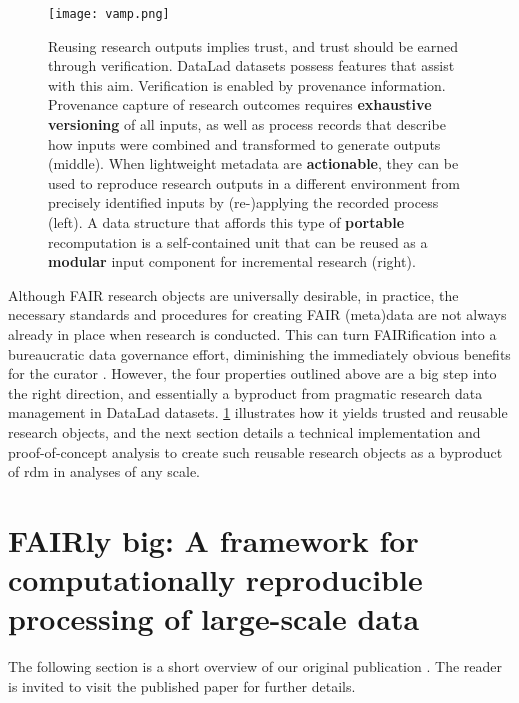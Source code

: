 \begin{figure}[H]
	\centering
	\texttt{[image: vamp.png]}
	\caption[DataLad datasets as reusable research objects]{Reusing research outputs implies trust, and trust should be earned through verification. DataLad datasets possess features that assist with this aim. Verification is enabled by provenance information. Provenance capture of research outcomes requires \textbf{exhaustive versioning} of all inputs, as well as process records that describe how inputs were combined and transformed to generate outputs (middle). When lightweight metadata are \textbf{actionable}, they can be used to reproduce research outputs in a different environment from precisely identified inputs by (re-)applying the recorded process (left). A data structure that affords this type of \textbf{portable} recomputation is a self-contained unit that can be reused as a \textbf{modular} input component for incremental research (right).
	}
	\label{fig:vamp}
\end{figure}

Although FAIR research objects are universally desirable, in practice, the necessary standards and procedures for creating FAIR (meta)data are not always already in place when research is conducted.
This can turn FAIRification into a bureaucratic data governance effort, diminishing the immediately obvious benefits for the curator \citep{zehl2016handling}.
However, the four properties outlined above are a big step into the right direction, and essentially a byproduct from pragmatic research data management in DataLad datasets.
\cref{fig:vamp} illustrates how it yields trusted and reusable research objects, and the next section details a technical implementation and proof-of-concept analysis to create such reusable research objects as a byproduct of \gls{rdm} in analyses of any scale.


\section{FAIRly big: A framework for computationally reproducible processing of large-scale data}

The following section is a short overview of our original publication \citep{wagner2022fairly}. The reader is invited to visit the published paper for further details.

